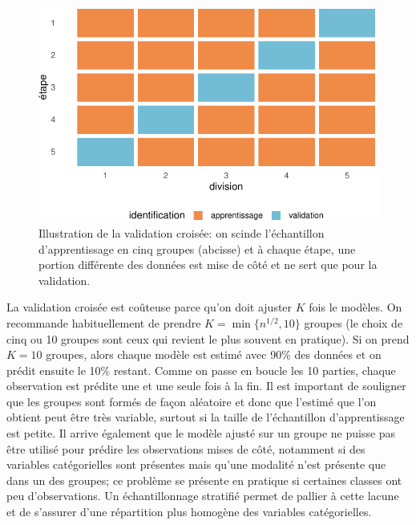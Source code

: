 \documentclass[
  11pt,
  letterpaper,
]{scrbook}
\theoremstyle{definition}
\theoremstyle{remark}
\begin{document}
\begin{figure}[ht!]

{\centering \includegraphics[width=1\textwidth,height=\textheight]{./04-selectionmodeles_files/figure-pdf/fig-validationcroiseeillust-1.pdf}

}

\caption{\label{fig-validationcroiseeillust}Illustration de la
validation croisée: on scinde l'échantillon d'apprentissage en cinq
groupes (abcisse) et à chaque étape, une portion différente des données
est mise de côté et ne sert que pour la validation.}

\end{figure}

La validation croisée est coûteuse parce qu'on doit ajuster \(K\) fois
le modèles. On recommande habituellement de prendre
\(K=\min\{n^{1/2}, 10\}\) groupes (le choix de cinq ou 10 groupes sont
ceux qui revient le plus souvent en pratique). Si on prend \(K=10\)
groupes, alors chaque modèle est estimé avec 90\% des données et on
prédit ensuite le 10\% restant. Comme on passe en boucle les 10 parties,
chaque observation est prédite une et une seule fois à la fin. Il est
important de souligner que les groupes sont formés de façon aléatoire et
donc que l'estimé que l'on obtient peut être très variable, surtout si
la taille de l'échantillon d'apprentissage est petite. Il arrive
également que le modèle ajusté sur un groupe ne puisse pas être utilisé
pour prédire les observations mises de côté, notamment si des variables
catégorielles sont présentes mais qu'une modalité n'est présente que
dans un des groupes; ce problème se présente en pratique si certaines
classes ont peu d'observations. Un échantillonnage stratifié permet de
pallier à cette lacune et de s'assurer d'une répartition plus homogène
des variables catégorielles.
\end{document}
